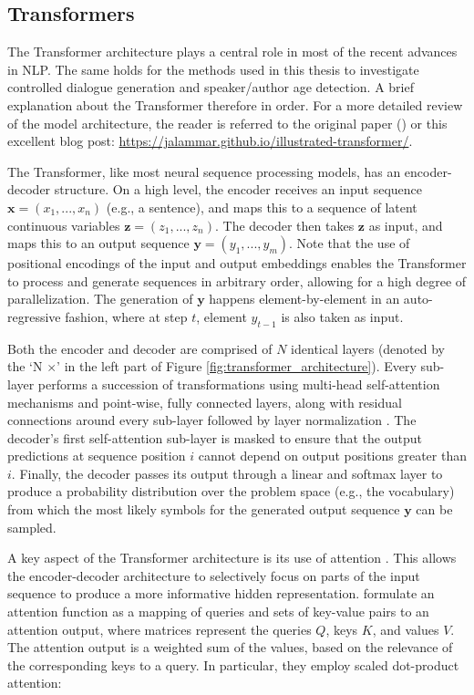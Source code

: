 \subsection{Transformers}

The Transformer architecture plays a central role in most of the recent advances in NLP. The same holds for the methods used in this thesis to investigate controlled dialogue generation and speaker/author age detection. A brief explanation about the Transformer therefore in order. For a more detailed review of the model architecture, the reader is referred to the original paper (\citep{vaswani2017attention}) or this excellent blog post: \url{https://jalammar.github.io/illustrated-transformer/}.

The Transformer, like most neural sequence processing models, has an encoder-decoder structure. On a high level, the encoder receives an input sequence $\textbf{x} = (x_1, ..., x_n)$ (e.g., a sentence), and maps this to a sequence of latent continuous variables $\textbf{z} = (z_1, ..., z_n)$. The decoder then takes $\textbf{z}$ as input, and maps this to an output sequence $\textbf{y} = (y_1, ..., y_m)$. Note that the use of positional encodings of the input and output embeddings enables the Transformer to process and generate sequences in arbitrary order, allowing for a high degree of parallelization. The generation of $\textbf{y}$ happens element-by-element in an auto-regressive fashion, where at step $t$, element $y_{t - 1}$ is also taken as input.

Both the encoder and decoder are comprised of $N$ identical layers (denoted by the `N $\times$' in the left part of Figure \ref{fig:transformer_architecture}). Every sub-layer performs a succession of transformations using multi-head self-attention mechanisms and point-wise, fully connected layers, along with residual connections \citep{he2016residual} around every sub-layer followed by layer normalization \citep{DBLP:journals/corr/BaKH16}. The decoder's first self-attention sub-layer is masked to ensure that the output predictions at sequence position $i$ cannot depend on output positions greater than $i$. Finally, the decoder passes its output through a linear and softmax layer to produce a probability distribution over the problem space (e.g., the vocabulary) from which the most likely symbols for the generated output sequence $\textbf{y}$ can be sampled.

A key aspect of the Transformer architecture is its use of attention \citep{DBLP:journals/corr/BahdanauCB14}. This allows the encoder-decoder architecture to selectively focus on parts of the input sequence to produce a more informative hidden representation. \citeauthor{vaswani2017attention} formulate an attention function as a mapping of queries and sets of key-value pairs to an attention output, where matrices represent the queries $Q$, keys $K$, and values $V$. The attention output is a weighted sum of the values, based on the relevance of the corresponding keys to a query. In particular, they employ scaled dot-product attention:

